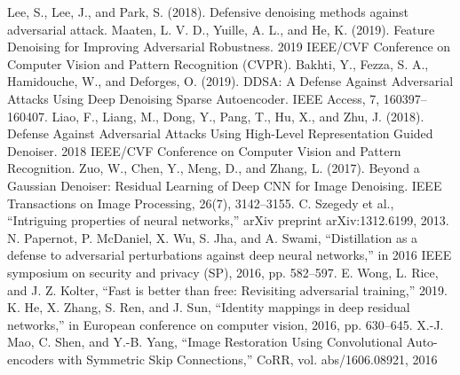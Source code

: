 \documentclass[10pt,journal,compsoc]{IEEEtran}
\begin{document}
\begin{thebibliography}{}
  Lee, S., Lee, J., and Park, S. (2018). Defensive denoising methods against adversarial attack. 
  Maaten, L. V. D., Yuille, A. L., and He, K. (2019). Feature Denoising for Improving Adversarial Robustness. 2019 IEEE/CVF Conference on Computer Vision and Pattern Recognition (CVPR).
  Bakhti, Y., Fezza, S. A., Hamidouche, W., and Deforges, O. (2019). DDSA: A Defense Against Adversarial Attacks Using Deep Denoising Sparse Autoencoder. IEEE Access, 7, 160397–160407.
  Liao, F., Liang, M., Dong, Y., Pang, T., Hu, X., and Zhu, J. (2018). Defense Against Adversarial Attacks Using High-Level Representation Guided Denoiser. 2018 IEEE/CVF Conference on Computer Vision and Pattern Recognition.
  Zuo, W., Chen, Y., Meng, D., and Zhang, L. (2017). Beyond a Gaussian Denoiser: Residual Learning of Deep CNN for Image Denoising. IEEE Transactions on Image Processing, 26(7), 3142–3155.
  C. Szegedy et al., “Intriguing properties of neural networks,” arXiv preprint arXiv:1312.6199, 2013. 
  N. Papernot, P. McDaniel, X. Wu, S. Jha, and A. Swami, “Distillation as a defense to adversarial perturbations against deep neural networks,” in 2016 IEEE symposium on security and privacy (SP), 2016, pp. 582–597. 
 E. Wong, L. Rice, and J. Z. Kolter, “Fast is better than free: Revisiting adversarial training,” 2019. 
  K. He, X. Zhang, S. Ren, and J. Sun, “Identity mappings in deep residual networks,” in European conference on computer vision, 2016, pp. 630–645.
  X.-J. Mao, C. Shen, and Y.-B. Yang, “Image Restoration Using Convolutional Auto-encoders with Symmetric Skip Connections,” CoRR, vol. abs/1606.08921, 2016

\end{thebibliography}
\end{document}
